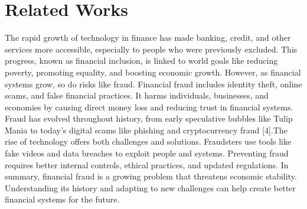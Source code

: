 \documentclass{styles/svproc}
\begin{document}
\section{Related Works}

The rapid growth of technology in finance has made banking, credit, and other services more accessible, especially to people who were previously excluded. This progress, known as financial inclusion, is linked to world goals like reducing poverty, promoting equality, and boosting economic growth. However, as financial systems grow, so do risks like fraud. Financial fraud includes identity theft, online scams, and false financial practices. It harms individuals, businesses, and economies by causing direct money loss and reducing trust in financial systems. Fraud has evolved throughout history, from early speculative bubbles like Tulip Mania to today’s digital scams like phishing and cryptocurrency fraud [4].The rise of technology offers both challenges and solutions. Fraudsters use tools like fake videos and data breaches to exploit people and systems. Preventing fraud requires better internal controls, ethical practices, and updated regulations. In summary, financial fraud is a growing problem that threatens economic stability. Understanding its history and adapting to new challenges can help create better financial systems for the future.
\end{document}
